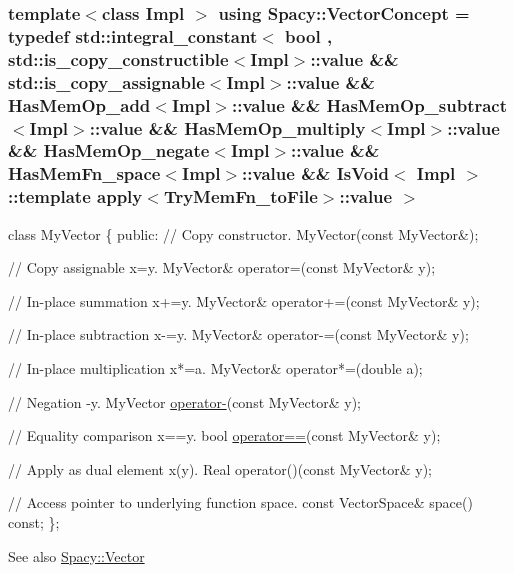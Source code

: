 \subsubsection[{Vector\+Concept}]{\setlength{\rightskip}{0pt plus 5cm}template$<$class Impl $>$ using {\bf Spacy\+::\+Vector\+Concept} = typedef std\+::integral\+\_\+constant$<$ bool , std\+::is\+\_\+copy\+\_\+constructible$<$Impl$>$\+::value \&\& std\+::is\+\_\+copy\+\_\+assignable$<$Impl$>$\+::value \&\& Has\+Mem\+Op\+\_\+add$<$Impl$>$\+::value \&\& Has\+Mem\+Op\+\_\+subtract$<$Impl$>$\+::value \&\& Has\+Mem\+Op\+\_\+multiply$<$Impl$>$\+::value \&\& Has\+Mem\+Op\+\_\+negate$<$Impl$>$\+::value \&\& Has\+Mem\+Fn\+\_\+space$<$Impl$>$\+::value \&\& Is\+Void$<$ Impl $>$\+::template apply$<$Try\+Mem\+Fn\+\_\+to\+File$>$\+::value $>$}\label{group__ConceptGroup_gac8fbeed0f838941e90ebe635a546e1db}

\begin{DoxyCode}
\textcolor{keyword}{class }MyVector
\{
\textcolor{keyword}{public}:
  \textcolor{comment}{// Copy constructor.}
  MyVector(\textcolor{keyword}{const} MyVector&);

  \textcolor{comment}{// Copy assignable x=y.}
  MyVector& operator=(\textcolor{keyword}{const} MyVector& y);

  \textcolor{comment}{// In-place summation x+=y.}
  MyVector& operator+=(\textcolor{keyword}{const} MyVector& y);

  \textcolor{comment}{// In-place subtraction x-=y.}
  MyVector& operator-=(\textcolor{keyword}{const} MyVector& y);

  \textcolor{comment}{// In-place multiplication x*=a.}
  MyVector& operator*=(\textcolor{keywordtype}{double} a);

  \textcolor{comment}{// Negation -y.}
  MyVector \hyperlink{namespaceSpacy_a8bc98f51c7beab86185bf97a29b36395}{operator-}(\textcolor{keyword}{const} MyVector& y);

  \textcolor{comment}{// Equality comparison x==y.}
  \textcolor{keywordtype}{bool} \hyperlink{namespaceSpacy_aef4930427aac4c8089b4c43b1c97cf25}{operator==}(\textcolor{keyword}{const} MyVector& y);

  \textcolor{comment}{// Apply as dual element x(y).}
  Real operator()(\textcolor{keyword}{const} MyVector& y);

  \textcolor{comment}{// Access pointer to underlying function space.}
  \textcolor{keyword}{const} VectorSpace& space() \textcolor{keyword}{const};
\};
\end{DoxyCode}


\begin{DoxySeeAlso}{See also}
\hyperlink{classSpacy_1_1Vector}{Spacy\+::\+Vector} 
\end{DoxySeeAlso}
